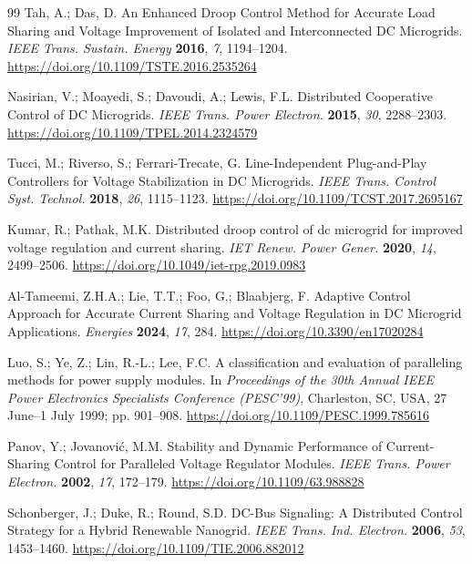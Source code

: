 \begin{thebibliography}{99}
Tah, A.; Das, D.
An Enhanced Droop Control Method for Accurate Load Sharing and Voltage Improvement of Isolated and Interconnected DC Microgrids.
\emph{IEEE Trans. Sustain. Energy} \textbf{2016}, \emph{7}, 1194--1204.
\url{https://doi.org/10.1109/TSTE.2016.2535264}

Nasirian, V.; Moayedi, S.; Davoudi, A.; Lewis, F.L.
Distributed Cooperative Control of DC Microgrids.
\emph{IEEE Trans. Power Electron.} \textbf{2015}, \emph{30}, 2288--2303.
\url{https://doi.org/10.1109/TPEL.2014.2324579}

Tucci, M.; Riverso, S.; Ferrari-Trecate, G.
Line-Independent Plug-and-Play Controllers for Voltage Stabilization in DC Microgrids.
\emph{IEEE Trans. Control Syst. Technol.} \textbf{2018}, \emph{26}, 1115--1123.
\url{https://doi.org/10.1109/TCST.2017.2695167}

Kumar, R.; Pathak, M.K.
Distributed droop control of dc microgrid for improved voltage regulation and current sharing.
\emph{IET Renew. Power Gener.} \textbf{2020}, \emph{14}, 2499--2506.
\url{https://doi.org/10.1049/iet-rpg.2019.0983}

Al-Tameemi, Z.H.A.; Lie, T.T.; Foo, G.; Blaabjerg, F.
Adaptive Control Approach for Accurate Current Sharing and Voltage Regulation in DC Microgrid Applications.
\emph{Energies} \textbf{2024}, \emph{17}, 284.
\url{https://doi.org/10.3390/en17020284}

Luo, S.; Ye, Z.; Lin, R.-L.; Lee, F.C.
A classification and evaluation of paralleling methods for power supply modules.
In \emph{Proceedings of the 30th Annual IEEE Power Electronics Specialists Conference (PESC'99)}, Charleston, SC, USA, 27 June--1 July 1999; pp. 901--908.
\url{https://doi.org/10.1109/PESC.1999.785616}

Panov, Y.; Jovanovi\'{c}, M.M.
Stability and Dynamic Performance of Current-Sharing Control for Paralleled Voltage Regulator Modules.
\emph{IEEE Trans. Power Electron.} \textbf{2002}, \emph{17}, 172--179.
\url{https://doi.org/10.1109/63.988828}

Schonberger, J.; Duke, R.; Round, S.D.
DC-Bus Signaling: A Distributed Control Strategy for a Hybrid Renewable Nanogrid.
\emph{IEEE Trans. Ind. Electron.} \textbf{2006}, \emph{53}, 1453--1460.
\url{https://doi.org/10.1109/TIE.2006.882012}


\end{thebibliography}
